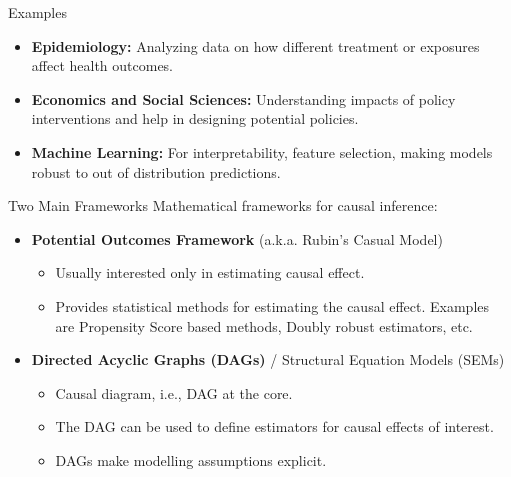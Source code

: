 \documentclass[aspectratio=169]{beamer}
\begin{document}
\begin{frame}{Examples}
	\begin{itemize}
		\item \textbf{Epidemiology:} Analyzing data on how different treatment or exposures affect health outcomes.
		\item \textbf{Economics and Social Sciences:} Understanding impacts of policy interventions and help in designing potential policies.
		\item \textbf{Machine Learning:} For interpretability, feature selection, making models robust to out of distribution predictions.
	\end{itemize}
\end{frame}

\begin{frame}{Two Main Frameworks}
	Mathematical frameworks for causal inference:
	\vspace{0.5em}
	\begin{itemize}
		\item \textbf{Potential Outcomes Framework} (a.k.a. Rubin's Casual Model)
			\begin{itemize}
				\item Usually interested only in estimating causal effect.
				\item Provides statistical methods for estimating the causal effect.
					Examples are Propensity Score based methods, Doubly robust estimators, etc.
			\end{itemize}
	\end{itemize}
	\vspace{2em}
	\begin{itemize}
		\item \textbf{Directed Acyclic Graphs (DAGs)} / Structural Equation Models (SEMs)
			\begin{itemize}
				\item Causal diagram, i.e., DAG at the core.
				\item The DAG can be used to define estimators for causal effects of interest.
				\item DAGs make modelling assumptions explicit.
			\end{itemize}
	\end{itemize}

\end{frame}
\end{document}
